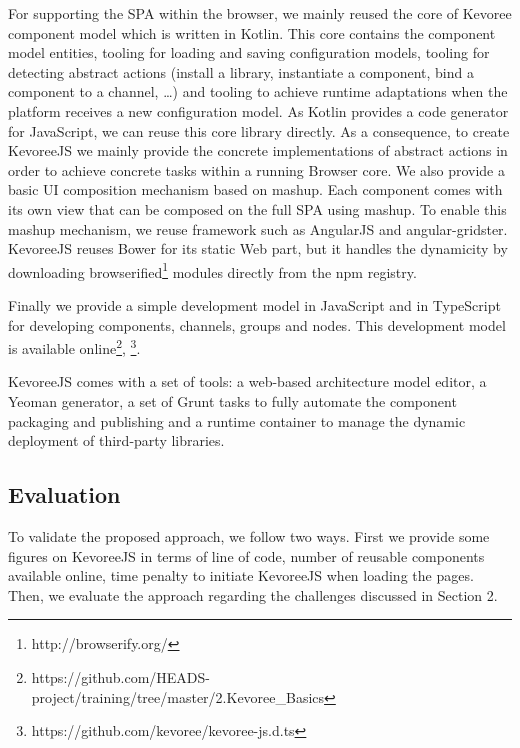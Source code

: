 For supporting the SPA within the browser, we mainly reused the core of Kevoree component model which is written in Kotlin. This core contains the component model entities, tooling for loading and saving configuration models, tooling for detecting abstract actions (install a library, instantiate a component, bind a component to a channel, …)  and tooling to achieve runtime adaptations when the platform receives a new configuration model. As Kotlin provides a code generator for JavaScript, we can reuse this core library directly. As a consequence, to create KevoreeJS we mainly provide the concrete implementations of abstract actions in order to achieve concrete tasks within a running Browser core. We also provide a basic UI composition mechanism based on mashup. Each component comes with its own view that can be composed on the full SPA using mashup. To enable this mashup mechanism, we reuse framework such as AngularJS and angular-gridster. KevoreeJS reuses Bower for its static Web part, but it handles the dynamicity by downloading browserified\footnote{http://browserify.org/} modules directly from the npm registry.


Finally we provide a simple development model in JavaScript and in TypeScript for developing components, channels, groups and nodes. This development model is available online\footnote{ https://github.com/HEADS-project/training/tree/master/2.Kevoree\_Basics}, \footnote{https://github.com/kevoree/kevoree-js.d.ts}.

KevoreeJS comes with a set of tools: a web-based architecture model editor, a Yeoman generator, a set of Grunt tasks to fully automate the component packaging and publishing and a runtime container to manage the dynamic deployment of third-party libraries.

\subsection{Evaluation}
To validate the proposed approach, we follow two ways. First we provide some figures on KevoreeJS in terms of line of code, number of reusable components available online, time penalty to initiate KevoreeJS when loading the pages. Then, we evaluate the approach regarding the challenges discussed in Section 2.

